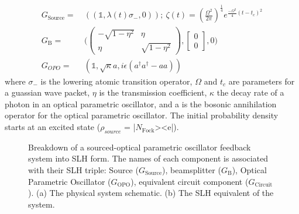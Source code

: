 \documentclass[a4paper]{article}
\theoremstyle{definition}
\begin{document}
\begin{align*}
    G_{\text{Source}} = & \ ((\mathbb{1}, \lambda(t) \sigma_-,0)); \ \zeta(t)  = (\frac{\Omega^2}{2\pi})^{\frac{1}{4}}e^{\frac{-\Omega^2}{4}(t-t_c)^2} \\
    G_{\text{B}} = & \ \Bigg( \begin{pmatrix} -\sqrt{1-\eta^2} & \eta \\ \eta & \sqrt{1-\eta^2} \end{pmatrix},\begin{bmatrix} 0 \\ 0\end{bmatrix}, 0 \Bigg) \\ 
    G_{OPO} = & \ (\mathbb{1}, \sqrt{\kappa}a, i\epsilon(a^\dagger a^\dagger - a a))
\end{align*}
where $\sigma_-$ is the lowering atomic transition operator, $\Omega$ and $t_c$ are parameters for a guassian wave packet, $\eta$ is the transmission coefficient, $\kappa$ the decay rate of a photon in an optical parametric oscillator, and a is the bosonic annihilation operator for the optical parametric oscillator. The initial probability density starts at an excited state ($\rho_{source}$ = |$N_{\text{Fock}}$><e|). 
\begin{figure}[H]
\centering
     \hspace{2cm}

     \caption{Breakdown of a sourced-optical parametric oscillator feedback system into SLH form. The names of each component is associated with their SLH triple: Source ($G_{\text{Source}}$), beamsplitter ($G_{\text{B}}$), Optical Parametric Oscillator ($G_{\text{OPO}}$), equivalent circuit component ($G_{\text{Circuit}}$). (a) The physical system schematic. (b) The SLH equivalent of the system.}
     \label{fig:SLH_form}
\end{figure}     
\end{document}
